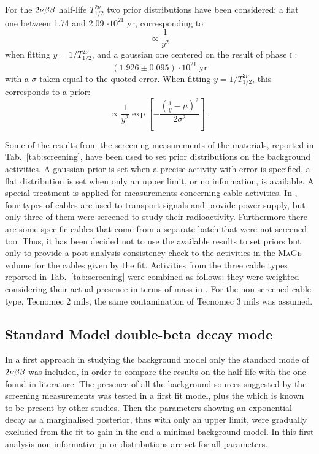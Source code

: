  For the $2\nu\beta\beta$ half-life $T_{1/2}^{2\nu}$ two prior distributions have been considered: a flat one between 1.74 and 2.09 $\cdot10^{21}$ yr, corresponding to
\[\propto\frac{1}{y^2}\]
when fitting $y=1/T_{1/2}^{2\nu}$, and a gaussian one centered on the result of {\gerda} phase \textsc{i} \cite{gerda2nbb}:
\[(1.926\pm0.095)\cdot10^{21}\;\text{yr}\]
with a $\sigma$ taken equal to the quoted error. When fitting $y=1/T_{1/2}^{2\nu}$, this corresponds to a prior:
\[\propto \frac{1}{y^2}\exp\left[-\frac{\left(\frac{1}{y}-\mu\right)^2}{2\sigma^2}\right]\;.\]

Some of the results from the screening measurements of the materials, reported in Tab.~\ref{tab:screening}, have been used to set prior distributions on the background activities. A gaussian prior is set when a precise activity with error is specified, a flat distribution is set when only an upper limit, or no information, is available. A special treatment is applied for measurements concerning cable activities. In {\gerda}, four types of cables are used to transport signals and provide power supply, but only three of them were screened to study their radioactivity. Furthermore there are some specific cables that come from a separate batch that were not screened too. Thus, it has been decided not to use the available results to set priors but only to provide a post-analysis consistency check to the activities in the \textsc{MaGe} volume for the cables given by the fit. Activities from the three cable types reported in Tab.~\ref{tab:screening} were combined as follows: they were weighted considering their actual presence in terms of mass in {\gerda}. For the non-screened cable type, Tecnomec 2 mils, the same contamination of Tecnomec 3 mils was assumed.

\subsection*{Standard Model double-beta decay mode}
In a first approach in studying the background model only the standard mode of $2\nu\beta\beta$ was included, in order to compare the results on the half-life with the one found in literature. The presence of all the background sources suggested by the screening measurements was tested in a first fit model, plus the  which is known to be present by other studies. Then the parameters showing an exponential decay as a marginalised posterior, thus with only an upper limit, were gradually excluded from the fit to gain in the end a minimal background model. In this first analysis non-informative prior distributions are set for all parameters.

